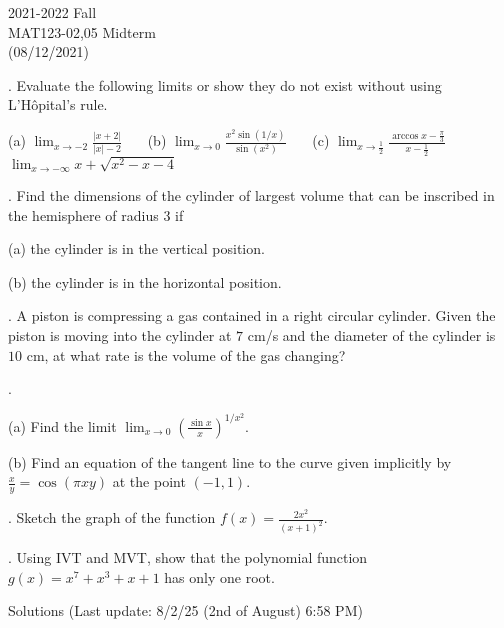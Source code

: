 \documentclass{article}
\begin{document}
\large

\begin{center}
2021-2022 Fall\\MAT123-02,05 Midterm\\(08/12/2021)
\end{center}

. Evaluate the following limits or show they do not exist without using L'Hôpital's rule.

\hfill

(a) $\displaystyle \lim_{x\to-2}\frac{\left|x+2\right|}{\left|x\right|-2}$ \ \ \ (b) $\displaystyle\lim_{x\to0}\frac{x^2\sin(1/x)}{\sin\left(x^2\right)}$ \ \ \ (c) $\displaystyle \lim_{x\to\frac12}\frac{\arccos x- \frac\pi3}{x-\frac12}$ \ \ \ $\displaystyle\lim_{x\to-\infty}x+\sqrt{x^2-x-4}$

\hfill

. Find the dimensions of the cylinder of largest volume that can be inscribed in the hemisphere of radius $3$ if

\hfill

(a) the cylinder is in the vertical position.

\hfill

(b) the cylinder is in the horizontal position.

\hfill

. A piston is compressing a gas contained in a right circular cylinder. Given the piston is moving into the cylinder at $7 $ cm/s and the diameter of the cylinder is $10$ cm, at what rate is the volume of the gas changing?

\hfill

.

(a) Find the limit $\displaystyle\lim_{x\to0}\left(\frac{\sin x}x\right)^{1/x^2}$.

\hfill

(b) Find an equation of the tangent line to the curve given implicitly by $\displaystyle \frac xy=\cos\left(\pi xy\right)$ at the point $(-1,1)$.

\hfill

. Sketch the graph of the function $\displaystyle f(x)=\frac{2x^2}{\left(x+1\right)^2}$.

\hfill

. Using IVT and MVT, show that the polynomial function $g(x) = x^7+x^3+x+1$ has only one root.

\newpage

\begin{center}
Solutions (Last update: 8/2/25 (2nd of August) 6:58 PM)
\end{center}
\end{document}
